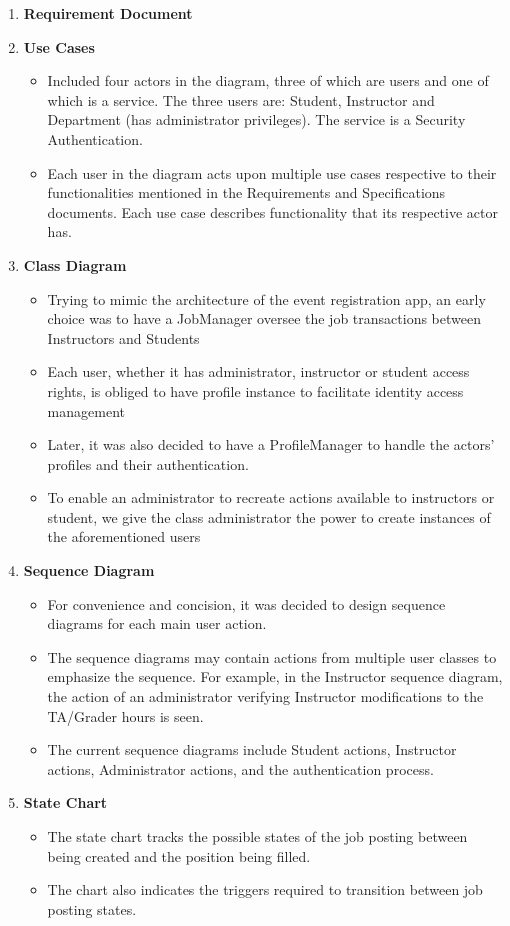\documentclass[12pt,openany]{report}
\begin{document}

\begin{enumerate}
    \item \textbf{Requirement Document}
    \item \textbf{Use Cases}
    \begin{itemize}
    	\item Included four actors in the diagram, three of which are users and one of which is a service. The three users are: Student, Instructor and Department (has administrator privileges). The service is a Security Authentication.
    	\item Each user in the diagram acts upon multiple use cases respective to their functionalities mentioned in the Requirements and Specifications documents. Each use case describes functionality that its respective actor has.
    \end{itemize}
    \item \textbf{Class Diagram}
    \begin{itemize}
        \item Trying to mimic the architecture of the event registration app, an early choice was to have a JobManager oversee the job transactions between Instructors and Students
        \item Each user, whether it has administrator, instructor or student access rights, is obliged to have profile instance to facilitate identity access management
		\item Later, it was also decided to have a ProfileManager to handle the actors' profiles and
			their authentication.
        \item To enable an administrator to recreate actions available to instructors or student, we give the class administrator the power to create instances of the aforementioned users
    \end{itemize}
    \item \textbf{Sequence Diagram}
		\begin{itemize}
			\item For convenience and concision, it was decided to design sequence diagrams for each
				main user action.
			\item The sequence diagrams may contain actions from multiple user classes to emphasize
				the sequence. For example, in the Instructor sequence diagram, the action of an
				administrator verifying Instructor modifications to the TA/Grader hours is seen.
			\item The current sequence diagrams include Student actions, Instructor actions,
				Administrator actions, and the authentication process.
		\end{itemize}
    \item \textbf{State Chart}
        \begin{itemize}
            \item The state chart tracks the possible states of the job posting between being created and the position being filled.
            \item The chart also indicates the triggers required to transition between job posting states.


\end{itemize}
\end{enumerate}
\end{document}

